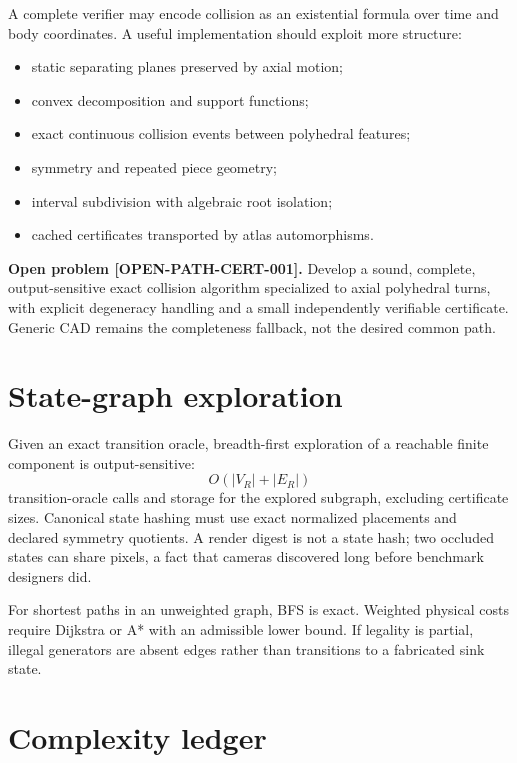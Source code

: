 \documentclass[11pt,openany]{book}
\newcommand{\claimid}[1]{\textnormal{\sffamily\footnotesize[#1]}}
\theoremstyle{polyplain}
\theoremstyle{polydef}
\begin{document}
A complete verifier may encode collision as an existential formula over time and body coordinates. A useful implementation should exploit more structure:
\begin{itemize}
  \item static separating planes preserved by axial motion;
  \item convex decomposition and support functions;
  \item exact continuous collision events between polyhedral features;
  \item symmetry and repeated piece geometry;
  \item interval subdivision with algebraic root isolation;
  \item cached certificates transported by atlas automorphisms.
\end{itemize}

\begin{warningbox}[label={open:path-certificates}]
\textbf{Open problem \claimid{OPEN-PATH-CERT-001}.}
Develop a sound, complete, output-sensitive exact collision algorithm specialized to axial polyhedral turns, with explicit degeneracy handling and a small independently verifiable certificate. Generic CAD remains the completeness fallback, not the desired common path.
\end{warningbox}

\section{State-graph exploration}

Given an exact transition oracle, breadth-first exploration of a reachable finite component is output-sensitive:
\[
O(|V_R|+|E_R|)
\]
transition-oracle calls and storage for the explored subgraph, excluding certificate sizes. Canonical state hashing must use exact normalized placements and declared symmetry quotients. A render digest is not a state hash; two occluded states can share pixels, a fact that cameras discovered long before benchmark designers did.

For shortest paths in an unweighted graph, BFS is exact. Weighted physical costs require Dijkstra or A* with an admissible lower bound. If legality is partial, illegal generators are absent edges rather than transitions to a fabricated sink state.

\section{Complexity ledger}
\label{sec:complexity-honesty}
\end{document}
